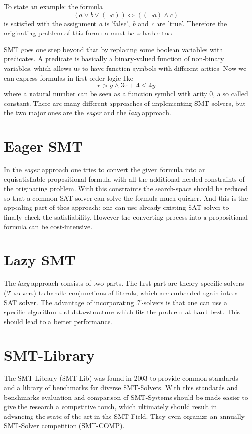 To state an example: the formula
\[(a \lor b \lor (\neg c)) \iff ((\neg a) \land c)\]
is satisfied with the assignment \textit{a} is 'false', \textit{b} and \textit{c} are 'true'. Therefore the originating problem of this formula must be solvable too.

SMT goes one step beyond that by replacing some boolean variables with predicates. A predicate is basically a binary-valued function of non-binary variables, which allows us to have function symbols with different arities. Now we can express formulas in first-order logic like
\[x > y \land 3 x + 4 \leq 4 y\]
where a natural number can be seen as a function symbol with arity 0, a so called constant.
There are many different approaches of implementing SMT solvers, but the two major ones are the \textit{eager} and the \textit{lazy} approach.

\section{Eager SMT}
In the \textit{eager} approach one tries to convert the given formula into an equisatisfiable propositional formula with all the additional needed constraints of the originating problem. With this constraints the search-space should be reduced so that a common SAT solver can solve the formula much quicker. And this is the appealing part of thes approach: one can use already existing SAT solver to finally check the satisfiability. However the converting process into a propositional formula can be cost-intensive.\cite{2009satisfiability}

\section{Lazy SMT}
The \textit{lazy} approach consists of two parts. The first part are theory-specific solvers ($\mathcal{T}$-solvers) to handle conjunctions of literals, which are embedded again into a SAT solver. The advantage of incorporating $\mathcal{T}$-solvers is that one can use a specific algorithm and data-structure which fits the problem at hand best. This should lead to a better performance.\cite{sebastiani2007lazy}

\section{SMT-Library}
The SMT-Library (SMT-Lib) was found in 2003 to provide common standards and a library of benchmarks for diverse SMT-Solvers. With this standards and benchmarks evaluation and comparison of SMT-Systems should be made easier to give the research a competitive touch, which ultimately should result in advancing the state of the art in the SMT-Field. They even organize an annually SMT-Solver competition (SMT-COMP).

